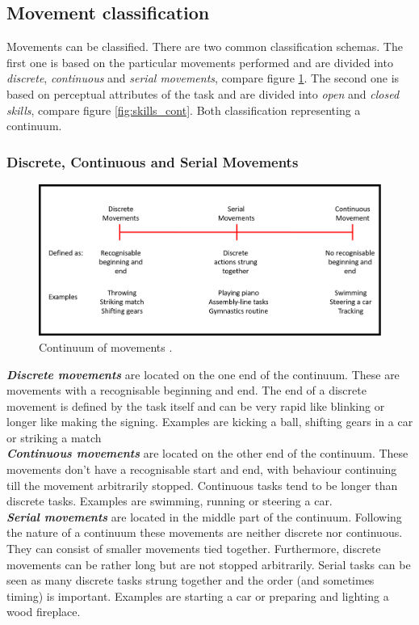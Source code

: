\subsection{Movement classification}
Movements can be classified. There are two common classification schemas. The first one is based on the particular movements performed and are divided into \textit{discrete}, \textit{continuous} and \textit{serial movements}, compare figure \ref{fig:movements_cont}. The second one is based on perceptual attributes of the task and are divided into \textit{open} and \textit{closed skills}, compare figure \ref{fig:skills_cont}. Both classification representing a continuum.

\subsubsection{Discrete, Continuous and Serial Movements}
\begin{figure}
	\centering
	\includegraphics[width=1.0\textwidth]{img/movement_classification.png}
	\caption{Continuum of movements \cite{Schmidt2011}.}
	\label{fig:movements_cont}
\end{figure}
\textit{\textbf{Discrete movements}} are located on the one end of the continuum. These are movements with a recognisable beginning and end. The end of a discrete movement is defined by the task itself and can be very rapid like blinking or longer like making the signing. Examples are kicking a ball, shifting gears in a car or striking a match\\
\textit{\textbf{Continuous movements}} are located on the other end of the continuum. These movements don't have a recognisable start and end, with behaviour continuing till the movement arbitrarily stopped. Continuous tasks tend to be longer than discrete tasks. Examples are swimming, running or steering a car.\\
\textit{\textbf{Serial movements}} are located in the middle part of the continuum. Following the nature of a continuum these movements are neither discrete nor continuous. They can consist of smaller movements tied together. Furthermore, discrete movements can be rather long but are not stopped arbitrarily. Serial tasks can be seen as many discrete tasks strung together and the order (and sometimes timing) is important. Examples are starting a car or preparing and lighting a wood fireplace.\\
